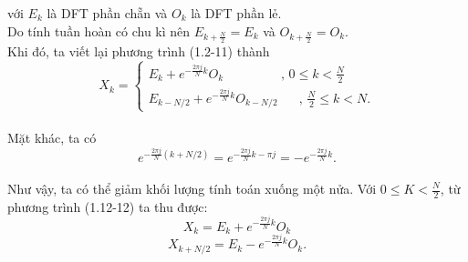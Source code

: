 với $E_k$ là DFT phần chẵn và $O_k$ là DFT phần lẻ. \\
Do tính tuần hoàn có chu kì nên
$E_{k+\frac{N}{2}}=E_k$
và
$O_{k+\frac{N}{2}}=O_k.$ \\
Khi đó, ta viết lại phương trình (1.2-11) thành
\begin{equation}
{X_k} = \left\{ {\begin{array}{*{20}{c}}
{{E_k} + {e^{ - \frac{{2\pi j}}{N}k}}{O_k}\,\,\,\,\,\,\,\,\,\,\,\,\,\,\,\,\,\,\,\,\,\,\,\,\,\,\,,\,0 \le k < \frac{N}{2}}\\
{{E_{k - N/2}} + {e^{ - \frac{{2\pi j}}{N}k}}{O_{k - N/2}}\,\,\,\,\,\,\,\,\,\,,\,\frac{N}{2} \le k < N.}
\end{array}} \right. \tag{1.2-12}
\end{equation} \\
Mặt khác, ta có
$${e^{ - \frac{{2\pi j}}{N}(k + N/2)}} = {e^{ - \frac{{2\pi j}}{N}k - \pi j}} =  - {e^{ - \frac{{2\pi j}}{N}k}}.$$ \\
Như vậy, ta có thể giảm khối lượng tính toán xuống một nửa. Với $0\le K < \frac{N}{2}$, từ phương trình (1.12-12) ta thu được:
$${X_k} = {E_k} + {e^{ - \frac{{2\pi j}}{N}k}}{O_k}
$$
$${X_{k + N/2}} = {E_k} - {e^{ - \frac{{2\pi j}}{N}k}}{O_k}.
$$

